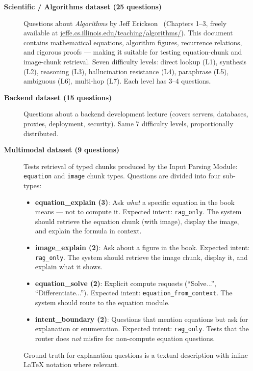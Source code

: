 \documentclass[12pt,a4paper]{article}
\begin{document}
\begin{description}
  \item[\textbf{Scientific / Algorithms dataset (25 questions)}] Questions about \emph{Algorithms} by Jeff Erickson~\cite{erickson2019algorithms} (Chapters 1--3, freely available at \url{jeffe.cs.illinois.edu/teaching/algorithms/}). This document contains mathematical equations, algorithm figures, recurrence relations, and rigorous proofs — making it suitable for testing equation-chunk and image-chunk retrieval. Seven difficulty levels: direct lookup (L1), synthesis (L2), reasoning (L3), hallucination resistance (L4), paraphrase (L5), ambiguous (L6), multi-hop (L7). Each level has 3--4 questions.

  \item[\textbf{Backend dataset (15 questions)}] Questions about a backend development lecture (covers servers, databases, proxies, deployment, security). Same 7 difficulty levels, proportionally distributed.

  \item[\textbf{Multimodal dataset (9 questions)}] Tests retrieval of typed chunks produced by the Input Parsing Module: \texttt{equation} and \texttt{image} chunk types. Questions are divided into four sub-types:
  \begin{itemize}
    \item \textbf{equation\_explain (3)}: Ask \emph{what} a specific equation in the book means — not to compute it. Expected intent: \texttt{rag\_only}. The system should retrieve the equation chunk (with image), display the image, and explain the formula in context.
    \item \textbf{image\_explain (2)}: Ask about a figure in the book. Expected intent: \texttt{rag\_only}. The system should retrieve the image chunk, display it, and explain what it shows.
    \item \textbf{equation\_solve (2)}: Explicit compute requests (``Solve...'', ``Differentiate...''). Expected intent: \texttt{equation\_from\_context}. The system should route to the equation module.
    \item \textbf{intent\_boundary (2)}: Questions that mention equations but ask for explanation or enumeration. Expected intent: \texttt{rag\_only}. Tests that the router does \emph{not} misfire for non-compute equation questions.
  \end{itemize}
  Ground truth for explanation questions is a textual description with inline \LaTeX{} notation where relevant.
\end{description}
\end{document}
